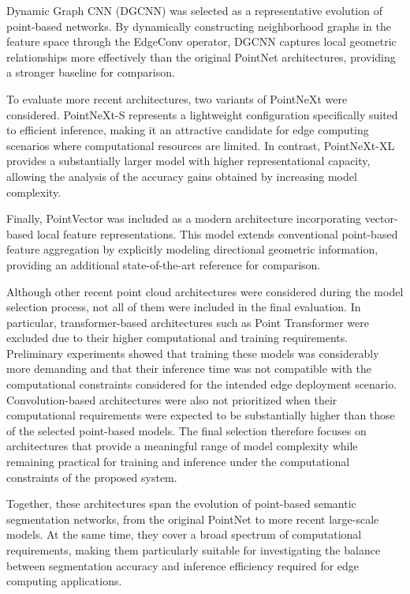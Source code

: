 Dynamic Graph CNN (DGCNN) \cite{Wang2019DGCNN} was selected as a representative evolution of point-based networks. By dynamically constructing neighborhood graphs in the feature space through the EdgeConv operator, DGCNN captures local geometric relationships more effectively than the original PointNet architectures, providing a stronger baseline for comparison.

To evaluate more recent architectures, two variants of PointNeXt \cite{PointNeXt} were considered. PointNeXt-S represents a lightweight configuration specifically suited to efficient inference, making it an attractive candidate for edge computing scenarios where computational resources are limited. In contrast, PointNeXt-XL provides a substantially larger model with higher representational capacity, allowing the analysis of the accuracy gains obtained by increasing model complexity.

Finally, PointVector \cite{PointVector} was included as a modern architecture incorporating vector-based local feature representations. This model extends conventional point-based feature aggregation by explicitly modeling directional geometric information, providing an additional state-of-the-art reference for comparison.

Although other recent point cloud architectures were considered during the model selection process, not all of them were included in the final evaluation. In particular, transformer-based architectures such as Point Transformer were excluded due to their higher computational and training requirements. Preliminary experiments showed that training these models was considerably more demanding and that their inference time was not compatible with the computational constraints considered for the intended edge deployment scenario. Convolution-based architectures were also not prioritized when their computational requirements were expected to be substantially higher than those of the selected point-based models. The final selection therefore focuses on architectures that provide a meaningful range of model complexity while remaining practical for training and inference under the computational constraints of the proposed system.


Together, these architectures span the evolution of point-based semantic segmentation networks, from the original PointNet to more recent large-scale models. At the same time, they cover a broad spectrum of computational requirements, making them particularly suitable for investigating the balance between segmentation accuracy and inference efficiency required for edge computing applications.


